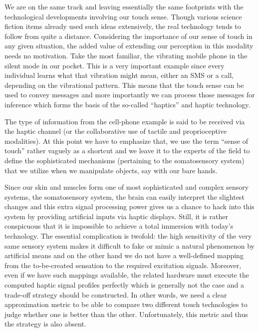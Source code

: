 We are on the same track and leaving essentially the same footprints with the technological developments involving our touch sense. 
Though various science fiction items already used such ideas extensively, the real technology tends to follow from quite a distance.  
Considering the importance of our sense of touch in any given situation, the added value of extending our perception in this modality 
needs no motivation. Take the most familiar, the vibrating mobile phone in the silent mode in our pocket. This is a very important 
example since every individual learns what that vibration might mean, either an SMS or a call, depending on the vibrational pattern. This 
means that the touch sense can be used to convey messages and more importantly we can process those messages for inference which forms 
the basis of the so-called \enquote{haptics} and haptic technology.


The type of information from the cell-phone example is said to be received via the haptic channel (or the collaborative use of tactile 
and proprioceptive modalities). At this point we have to emphasize that, we use the term \enquote{sense of touch} rather vaguely as a 
shortcut and we leave it to the experts of the field to define the sophisticated mechanisms (pertaining to the somatosensory system) that 
we utilize when we manipulate objects, say with our bare hands. 


Since our skin and muscles form one of most sophisticated and complex sensory systems, the somatosensory system, the brain can easily 
interpret the slightest changes and this extra signal processing power gives us a chance to hack into this system by providing artificial 
inputs via haptic displays. Still, it is rather conspicuous that it is impossible to achieve a total immersion with today's technology. 
The essential complication is twofold: the high sensitivity of the very same sensory system makes it difficult to fake or mimic a natural 
phenomenon by artificial means and on the other hand we do not have a well-defined mapping from the to-be-created sensation to the 
required excitation signals. Moreover, even if we have such mappings available, the related hardware must execute the computed haptic 
signal profiles perfectly which is generally not the case and a trade-off strategy should be constructed. In other words, we need a clear 
approximation metric to be able to compare two different touch technologies to judge whether one is better than the other. Unfortunately, 
this metric and thus the strategy is also absent. 
 
